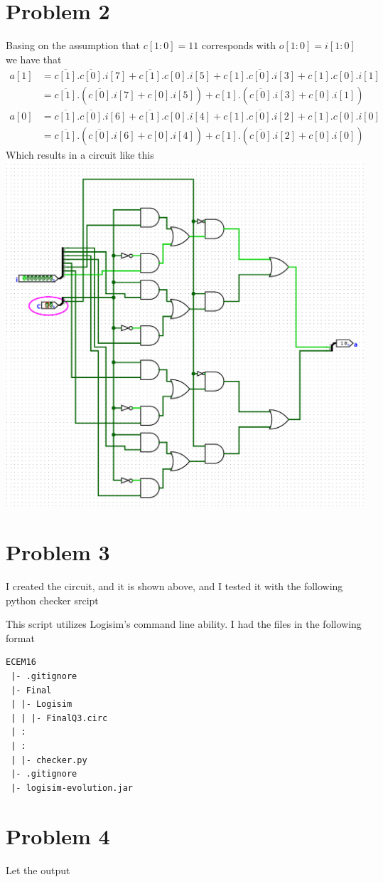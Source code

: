 \documentclass[12pt]{article}
\begin{document}
\section*{Problem 2}
Basing on the assumption that $c[1:0]=11$ corresponds with $o[1:0]=i[1:0]$
we have that 
\begin{align*}
    a[1]&=\overline{c[1]}.\overline{c[0]}.i[7]+\overline{c[1]}.c[0].i[5]+
        c[1].\overline{c[0]}.i[3]+c[1].c[0].i[1]\\
        &=\overline{c[1]}.(\overline{c[0]}.i[7]+c[0].i[5])+c[1].(\overline{c[0]}.i[3]+c[0].i[1])
\end{align*}
\begin{align*}
    a[0]&=\overline{c[1]}.\overline{c[0]}.i[6]+\overline{c[1]}.c[0].i[4]+
        c[1].\overline{c[0]}.i[2]+c[1].c[0].i[0]\\
        &=\overline{c[1]}.(\overline{c[0]}.i[6]+c[0].i[4])+c[1].(\overline{c[0]}.i[2]+c[0].i[0])
\end{align*}
Which results in a circuit like this\\
\includegraphics[scale=0.25]{fig1.png}
\section*{Problem 3}
I created the circuit, and it is shown above, and I tested it with the following python checker srcipt

This script utilizes Logisim's command line ability. I had the files in the following format
\begin{verbatim}
ECEM16
 |- .gitignore
 |- Final
 | |- Logisim
 | | |- FinalQ3.circ
 | :
 | :
 | |- checker.py
 |- .gitignore
 |- logisim-evolution.jar
\end{verbatim}
\section*{Problem 4}
Let the output 
\end{document}
